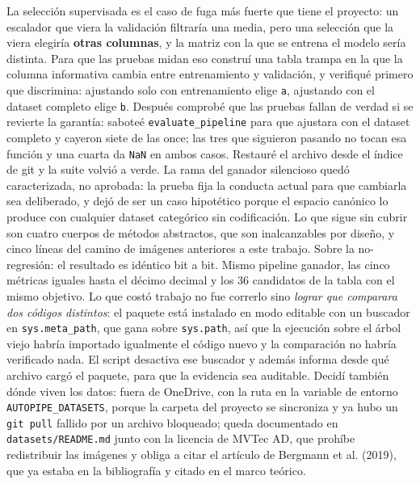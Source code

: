 \documentclass[11pt,letterpaper]{article}
\begin{document}
{La selección supervisada es el caso de fuga más fuerte que tiene el proyecto: un
 escalador que viera la validación filtraría una media, pero una selección que la viera
 elegiría \textbf{otras columnas}, y la matriz con la que se entrena el modelo sería
 distinta. Para que las pruebas midan eso construí una tabla trampa en la que la columna
 informativa cambia entre entrenamiento y validación, y verifiqué primero que discrimina:
 ajustando solo con entrenamiento elige \texttt{a}, ajustando con el dataset completo
 elige \texttt{b}. Después comprobé que las pruebas fallan de verdad si se revierte la
 garantía: saboteé \texttt{evaluate\_pipeline} para que ajustara con el dataset completo y
 cayeron siete de las once; las tres que siguieron pasando no tocan esa función y una
 cuarta da \texttt{NaN} en ambos casos. Restauré el archivo desde el índice de git y la
 suite volvió a verde. La rama del ganador silencioso quedó caracterizada, no aprobada: la
 prueba fija la conducta actual para que cambiarla sea deliberado, y dejó de ser un caso
 hipotético porque el espacio canónico lo produce con cualquier dataset categórico sin
 codificación. Lo que sigue sin cubrir son cuatro cuerpos de métodos abstractos, que son
 inalcanzables por diseño, y cinco líneas del camino de imágenes anteriores a este
 trabajo. Sobre la no-regresión: el resultado es idéntico bit a bit. Mismo pipeline
 ganador, las cinco métricas iguales hasta el décimo decimal y los 36 candidatos de la
 tabla con el mismo objetivo. Lo que costó trabajo no fue correrlo sino \emph{lograr que
 comparara dos códigos distintos}: el paquete está instalado en modo editable con un
 buscador en \texttt{sys.meta\_path}, que gana sobre \texttt{sys.path}, así que la
 ejecución sobre el árbol viejo habría importado igualmente el código nuevo y la
 comparación no habría verificado nada. El script desactiva ese buscador y además informa
 desde qué archivo cargó el paquete, para que la evidencia sea auditable. Decidí también
 dónde viven los datos: fuera de OneDrive, con la ruta en la variable de entorno
 \texttt{AUTOPIPE\_DATASETS}, porque la carpeta del proyecto se sincroniza y ya hubo un
 \texttt{git pull} fallido por un archivo bloqueado; queda documentado en
 \texttt{datasets/README.md} junto con la licencia de MVTec AD, que prohíbe
 redistribuir las imágenes y obliga a citar el artículo de Bergmann et al. (2019), que ya
 estaba en la bibliografía y citado en el marco teórico.}
\end{document}
